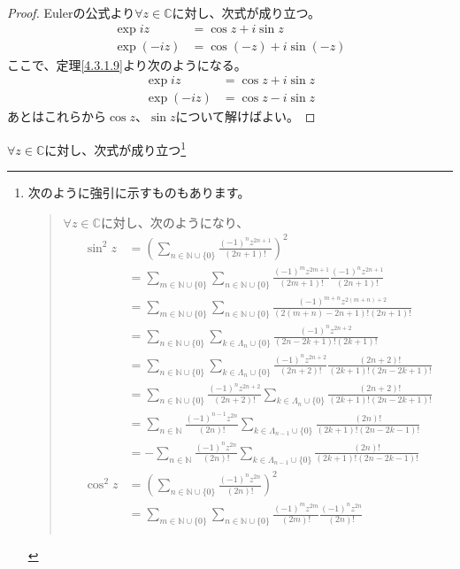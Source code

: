 \documentclass[dvipdfmx]{jsarticle}
\begin{document}
\begin{proof}
Eulerの公式より$\forall z \in \mathbb{C}$に対し、次式が成り立つ。
\begin{align*}
\exp{iz} &= \cos z + i\sin z\\
\exp( - iz) &= \cos( - z) + i\sin( - z)
\end{align*}
ここで、定理\ref{4.3.1.9}より次のようになる。
\begin{align*}
\exp{iz} &= \cos z + i\sin z\\
\exp( - iz) &= \cos z - i\sin z
\end{align*}
あとはこれらから$\cos z$、$\sin z$について解けばよい。
\end{proof}
\begin{thm}\label{4.3.1.15}
$\forall z \in \mathbb{C}$に対し、次式が成り立つ\footnote{次のように強引に示すものもあります。
\begin{quote}
$\forall z\in \mathbb{C}$に対し、次のようになり、
\begin{align*}
  \sin^{2}z &=\left(\sum_{n\in \mathbb{N} \cup \{ 0\} }{\frac{(-1)^{n}z^{2n+1}}{(2n+1)!}}\right)^{2}\\
  &=\sum_{m\in \mathbb{N} \cup \{ 0\} }\sum_{n\in \mathbb{N} \cup \{ 0\} }{\frac{(-1)^{m}z^{2m+1}}{(2m+1)!}}{\frac{(-1)^{n}z^{2n+1}}{(2n+1)!}}\\
  &=\sum_{m\in \mathbb{N} \cup \{ 0\} }\sum_{n\in \mathbb{N} \cup \{ 0\} }{\frac{(-1)^{m+n}z^{2(m+n)+2}}{(2(m+n)-2n+1)!(2n+1)!}}\\
  &=\sum_{n\in \mathbb{N} \cup \{ 0\} }\sum_{k\in \varLambda_n \cup \{ 0\} }{\frac{(-1)^{n}z^{2n+2}}{(2n-2k+1)!(2k+1)!}}\\
  &=\sum_{n\in \mathbb{N} \cup \{ 0\} }\sum_{k\in \varLambda_n \cup \{ 0\} }{\frac{(-1)^{n}z^{2n+2}}{(2n+2)!}}{\frac{(2n+2)!}{(2k+1)!(2n-2k+1)!}}\\
  &=\sum_{n\in \mathbb{N} \cup \{ 0\} }\frac{(-1)^{n}z^{2n+2}}{(2n+2)!}\sum_{k\in \varLambda_n \cup \{ 0\} }\frac{(2n+2)!}{(2k+1)!(2n-2k+1)!}\\
  &=\sum_{n\in \mathbb{N}}\frac{(-1)^{n-1}z^{2n}}{(2n)!}\sum_{k\in \varLambda_{n-1} \cup \{ 0\} }\frac{(2n)!}{(2k+1)!(2n-2k-1)!}\\
  &=-\sum_{n\in \mathbb{N}}\frac{(-1)^{n}z^{2n}}{(2n)!}\sum_{k\in \varLambda_{n-1} \cup \{ 0\} }\frac{(2n)!}{(2k+1)!(2n-2k-1)!}\\
  \cos^{2}z &=\left(\sum_{n\in \mathbb{N} \cup \{ 0\} }{\frac{(-1)^{n}z^{2n}}{(2n)!}}\right)^{2}\\
  &=\sum_{m\in \mathbb{N} \cup \{ 0\} }\sum_{n\in \mathbb{N} \cup \{ 0\} }{\frac{(-1)^{m}z^{2m}}{(2m)!}}{\frac{(-1)^{n}z^{2n}}{(2n)!}}\\

\end{align*}
\end{quote}}
\end{thm}
\end{document}
